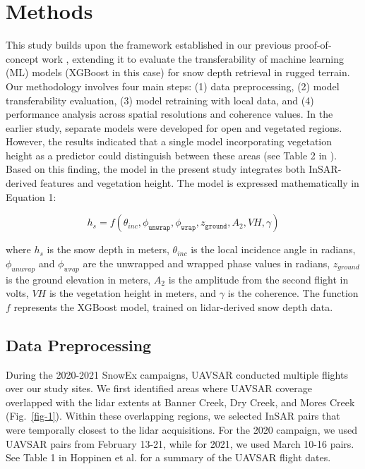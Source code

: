 \documentclass[lettersize,journal]{IEEEtran}
\begin{document}
\section{Methods}

This study builds upon the framework established in our previous proof-of-concept work \cite{alabi5advancing}, extending it to evaluate the transferability of machine learning (ML) models (XGBoost in this case) for snow depth retrieval in rugged terrain. Our methodology involves four main steps: (1) data preprocessing, (2) model transferability evaluation, (3) model retraining with local data, and (4) performance analysis across spatial resolutions and coherence values. In the earlier study, separate models were developed for open and vegetated regions. However, the results indicated that a single model incorporating vegetation height as a predictor could distinguish between these areas (see Table 2 in \cite{alabi5advancing}). Based on this finding, the model in the present study integrates both InSAR-derived features and vegetation height. The model is expressed mathematically in Equation 1:

\begin{equation}
  \label{eq:1}
  h_s = f(\theta_{inc}, \phi_{\texttt{unwrap}}, \phi_{\texttt{wrap}}, z_{\texttt{ground}}, A_2, VH, \gamma)
\end{equation}

where $h_s$ is the snow depth in meters, $\theta_{inc}$ is the local incidence angle in radians, $\phi_{unwrap}$ and $\phi_{wrap}$ are the unwrapped and wrapped phase values in radians, $z_{ground}$ is the ground elevation in meters, $A_2$ is the amplitude from the second flight in volts, $VH$ is the vegetation height in meters, and $\gamma$ is the coherence. The function $f$ represents the XGBoost model, trained on lidar-derived snow depth data.

\subsection{Data Preprocessing}

During the 2020-2021 SnowEx campaigns, UAVSAR conducted multiple flights over our study sites. We first identified areas where UAVSAR coverage overlapped with the lidar extents at Banner Creek, Dry Creek, and Mores Creek (Fig.~\ref{fig-1}). Within these overlapping regions, we selected InSAR pairs that were temporally closest to the lidar acquisitions. For the 2020 campaign, we used UAVSAR pairs from February 13-21, while for 2021, we used March 10-16 pairs. See Table 1 in Hoppinen et al. \cite{hoppinen2023snow} for a summary of the UAVSAR flight dates. 
\end{document}

